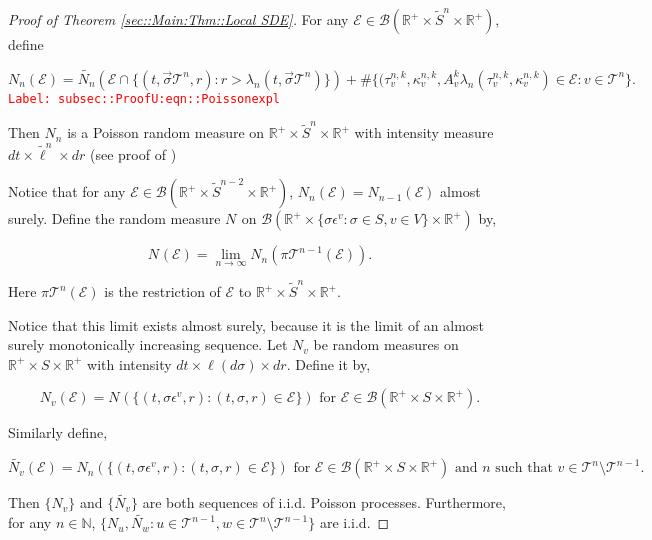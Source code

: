 \documentclass[12pt]{article}
\newcommand{\mb}{\mathbb}
\newcommand{\mc}{\mathcal}
\newcommand{\ms}{\mathscr}
\newcommand{\ra}{\rightarrow}
\newcommand{\te}{\text}
\newcommand{\ep}{\epsilon}
\newcommand{\tr}{\textcolor{red}}
\newcommand{\labe}[1]{\tr{\texttt{Label: #1}}}
\newcommand{\ind}{\hspace{24pt}}
\renewcommand{\v}{v}							%
\newcommand{\vv}{u}								%
\newcommand{\vvv}{w}							%
\renewcommand{\S}{S}							%
\newcommand{\s}{\sigma}							%
\newcommand{\sv}{\vec{\s}}						%
\newcommand{\ev}[1]{\ep^{#1}}					%
\renewcommand{\t}{t}							%
\newcommand{\proj}{\pi}							%
\newcommand{\poiss}[1]{N_{#1}}						%
\newcommand{\pup}[1]{^{#1}}							%
\newcommand{\tree}{\mc{T}}							%
\newcommand{\V}{V}									%
\renewcommand{\r}{r}								%
\newcommand{\rt}[1]{\tau^{#1}}						%
\renewcommand{\it}{k}								%
\newcommand{\numb}{n}								%
\newcommand{\XState}[1]{\S^{#1}}				%
\newcommand{\rate}[1]{\lambda_{#1}}					%
\newcommand{\Sm}{\ell}								%
\newcommand{\alt}{\widetilde}						%
\newcommand{\rv}{A}								%
\newcommand{\evnt}{\mc{E}}						%
\renewcommand{\mark}[1]{\kappa^{#1}}				%
\begin{document}
\begin{proof}[Proof of Theorem \ref{sec::Main:Thm::Local SDE}]
For any \(\evnt \in \ms{B}(\mb{R}^+\times\alt{\S}^\numb\times\mb{R}^+)\), define

\begin{equation}
\poiss{\numb}(\evnt) = \alt{\poiss{\numb}}\left(\evnt\cap\{(t,\sv{\tree\pup{\numb}},\r):\r > \rate{\numb}(\t,\sv{\tree\pup{\numb}})\}\right) + \#\{(\rt{\numb,\it}_\v,\mark{\numb,\it}_\v,\rv_{\v}^{\it}\rate{\numb}(\rt{\numb,\it}_\v,\mark{\numb,\it}_\v) \in \evnt: \v\in \tree\pup{\numb}\}.
\label{subsec::ProofU:eqn::Poissonexpl}
\end{equation}
\labe{subsec::ProofU:eqn::Poissonexpl}

Then \(\poiss{\numb}\) is a Poisson random measure on \(\mb{R}^+\times\alt{\S}^\numb\times \mb{R}^+\) with intensity measure \(d\t\times \alt{\Sm}^\numb\times d\r\) (see proof of \cite[Theorem 14.7.1(b)]{DalVer08})

\ind Notice that for any \(\evnt \in \ms{B}(\mb{R}^+\times \alt{\S}^{\numb-2}\times \mb{R}^+)\), \(\poiss{\numb}(\evnt) = \poiss{\numb-1}(\evnt)\) almost surely. Define the random measure \(\poiss{}\) on \(\ms{B}(\mb{R}^+\times \{\s\ev{\v}:\s\in \S,\v \in \V\}\times \mb{R}^+)\) by,

\[\poiss{}(\evnt) = \lim_{\numb \ra\infty}\poiss{\numb}\left(\proj{\tree\pup{\numb-1}}{}(\evnt)\right).\]

Here \(\proj{\tree\pup{\numb}}{}(\evnt)\) is the restriction of \(\evnt\) to \(\mb{R}^+\times \alt{\S}^\numb\times\mb{R}^+\). 

\ind Notice that this limit exists almost surely, because it is the limit of an almost surely monotonically increasing sequence. Let \(\poiss{\v}\) be random measures on \(\mb{R}^+\times\S\times\mb{R}^+\) with intensity \(d\t\times\Sm(d\s)\times d\r\). Define it by,

\[\poiss{\v}(\evnt) = \poiss{}\left(\{(\t,\s\ev{\v},\r):(\t,\s,\r)\in \evnt\}\right) \te{ for } \evnt \in \ms{B}(\mb{R}^+\times\S\times\mb{R}^+).\]

Similarly define,

\[\alt{\poiss{\v}}(\evnt) = \poiss{\numb}\left(\{(\t,\s\ev{\v},\r):(\t,\s,\r)\in \evnt\}\right)\te{ for } \evnt \in \ms{B}(\mb{R}^+\times\S\times\mb{R}^+)\te{ and }\numb\te{ such that } \v\in \tree\pup{\numb}\setminus\tree\pup{\numb-1}.\]

Then \(\{\poiss{\v}\}\) and \(\{\alt{\poiss{\v}}\}\) are both sequences of i.i.d. Poisson processes. Furthermore, for any \(\numb \in \mb{N}\), \(\{\poiss{\vv},\alt{\poiss{\vvv}}:\vv\in \tree\pup{\numb-1},\vvv\in\tree\pup{\numb}\setminus\tree\pup{\numb-1}\}\) are i.i.d.


\end{proof}
\end{document}
